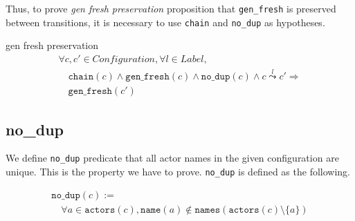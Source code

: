 
Thus, to prove \textit{gen fresh preservation} proposition that \texttt{gen\_fresh} is preserved between transitions, it is necessary to use \texttt{chain} and \texttt{no\_dup} as hypotheses.

\begin{lemma}{gen fresh preservation}
\begin{displaymath}
  \begin{array}{l}
    \forall c, c' \in \textit{Configuration}, \forall l \in \textit{Label}, \\
    \quad \texttt{chain}(c) \wedge \texttt{gen\_fresh}(c) \wedge \texttt{no\_dup}(c) \wedge c \overset{l}{\leadsto} c' \Rightarrow \\
    \quad \texttt{gen\_fresh}(c')
  \end{array}
\end{displaymath}
\end{lemma}

\subsection{no\_dup}
We define \texttt{no\_dup} predicate that all actor names in the given configuration are unique.
This is the property we have to prove.
\texttt{no\_dup} is defined as the following.

\begin{displaymath}
  \begin{array}{l}
    \texttt{no\_dup}(c) := \\
    \quad \forall a \in \texttt{actors}(c), \texttt{name}(a) \notin
    \texttt{names}(\texttt{actors}(c) \setminus \{a\})
  \end{array}
\end{displaymath}

